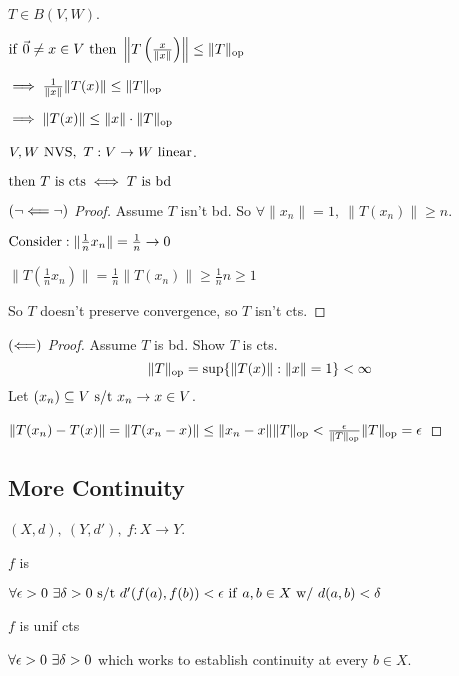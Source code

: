 \documentclass[12pt]{article}
\begin{document}
\bboxnote
\begin{note}
    \(T\in B(V,W).\)

    \(\iif\ \vec 0\neq x\in V\ \tthen\ 
    \left\|T\left(\frac x{\|x\|}\right)\right\|\le\|T\|_\TR{op}\)

    \(\implies \frac1{\|x\|}\|T(x)\|\le\|T\|_{\mathrm{op}}\)

    \(\implies\|T(x)\|\le\|x\|\cdot\|T\|_{\mathrm{op}}\)
\end{note}
\ebox

\bboxprop
\begin{prop}
    \(V,W\ \TR{NVS},\ T:V\to W\ \TR{linear}\).

    \(\tthen\ T\ \is\ \TR{cts}\iff T\ \is\ \TR{bd}\)
\end{prop}
\ebox

\bboxproof
\begin{proof}[\((\neg\Longleftarrow\neg)\) Proof]
    Assume \(T\) isn't bd. So
    \(\forall\|x_n\|=1,\ \|T(x_n)\|\ge n\).

    \(\mathrm{Consider}: \|\frac1nx_n\|=\frac1n\to 0\)

    \(\|T(\frac1nx_n)\|=\frac1n\|T(x_n)\|\ge\frac1nn\ge1\)

    So \(T\) doesn't preserve convergence, so \(T\) isn't cts.
\end{proof}
\ebox

\bboxproof
\begin{proof}[\((\Longleftarrow)\) Proof]
    Assume \(T\) is bd. Show \(T\) is cts.
    \[
        \|T\|_{\mathrm{op}}=\sup\{\|T(x)\|:\|x\|=1\}<\infty
    \]
    Let \((x_n)\subseteq V\text{ s/t } x_n\to x\in V\).

    \(\|T(x_n) - T(x)\|=\|T(x_n-x)\|\le\|x_n-x\|\|T\|_{\mathrm{op}}<\frac{\epsilon}{\|T\|_{\mathrm{op}}}
    \|T\|_{\mathrm{op}}=\epsilon\)
\end{proof}
\ebox

\subsection{More Continuity}


\bboxdefn
\begin{defn}
    \((X,d),\ (Y,d'),\ f:X\to Y\).

    \(f\) is  

    \(\forall\e>0\ \exists\delta>0\st
    d'(f(a),f(b))<\e\ \iif\ a,b\in X\ \TR{w/}\ 
    d(a,b)<\delta\)
\end{defn}
\ebox

\bboxnote
\begin{note}
    \(f\) is unif cts 

    \(\forall\epsilon>0\ \exists\delta>0\) which works to establish
    continuity at every \(b\in X\).
\end{note}
\ebox
\end{document}

